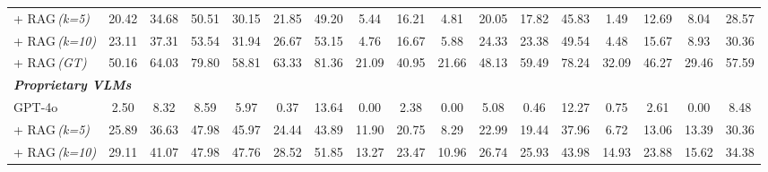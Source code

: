 \begin{table*}[t]
{\begin{tabular}{l|cc|c|c|cc|cc|cc|cc|cc|cc}
\hspace{2em}  + RAG\,\textit{(k=5)} & \colorbox{lightred!75}{20.42} & \colorbox{lightred!75}{34.68} & \colorbox{lightred!75}{50.51} & \colorbox{lightred!75}{30.15} & 21.85 & \colorbox{lightred!75}{49.20} & \colorbox{lightred!75}{5.44} & \colorbox{lightred!75}{16.21} & \colorbox{lightred!75}{4.81} & 20.05 & \colorbox{lightred!75}{17.82} & \colorbox{lightred!75}{45.83} & \colorbox{lightred!75}{1.49} & \colorbox{lightred!75}{12.69} & \colorbox{lightred!75}{8.04} & \colorbox{lightred!75}{28.57} \\

\hspace{2em}  + RAG\,\textit{(k=10)} & \colorbox{lightred!75}{23.11} & \colorbox{lightred!75}{37.31} & \colorbox{lightred!75}{53.54} & \colorbox{lightred!75}{31.94} & \colorbox{lightred!75}{26.67} & \colorbox{lightred!75}{53.15} & \colorbox{lightred!75}{4.76} & \colorbox{lightred!75}{16.67} & \colorbox{lightred!75}{5.88} & \colorbox{lightred!75}{24.33} & \colorbox{lightred!75}{23.38} & \colorbox{lightred!75}{49.54} & \colorbox{lightred!75}{4.48} & \colorbox{lightred!75}{15.67} & \colorbox{lightred!75}{8.93} & \colorbox{lightred!75}{30.36} \\

\hspace{2em}  + RAG\,\textit{(GT)} & \colorbox{lightred!75}{50.16} & \colorbox{lightred!75}{64.03} & \colorbox{lightred!75}{79.80} & \colorbox{lightred!75}{58.81} & 63.33 & \colorbox{lightred!75}{81.36} & \colorbox{lightred!75}{21.09} & \colorbox{lightred!75}{40.95} & 21.66 & \colorbox{lightred!75}{48.13} & 59.49 & 78.24 & \colorbox{lightred!75}{32.09} & \colorbox{lightred!75}{46.27} & \colorbox{lightred!75}{29.46} & \colorbox{lightred!75}{57.59} \\

\midrule
\multicolumn{17}{l}{\textit{\textbf{Proprietary VLMs}}} \\
\midrule
GPT-4o & 2.50 & 8.32 & \colorbox{lightblue!75}{8.59} & \colorbox{lightblue!75}{5.97} & 0.37 & 13.64 & \colorbox{lightblue!75}{0.00} & 2.38 & 0.00 & 5.08 & 0.46 & 12.27 & 0.75 & 2.61 & 0.00 & 8.48 \\

\hspace{2em}  + RAG\,\textit{(k=5)} & 25.89 & 36.63 & 47.98 & 45.97 & \colorbox{lightblue!75}{24.44} & 43.89 & 11.90 & 20.75 & \colorbox{lightblue!75}{8.29} & 22.99 & 19.44 & 37.96 & 6.72 & 13.06 & 13.39 & 30.36 \\

\hspace{2em}  + RAG\,\textit{(k=10)} & 29.11 & 41.07 & 47.98 & 47.76 & 28.52 & 51.85 & 13.27 & 23.47 & \colorbox{lightblue!75}{10.96} & 26.74 & \colorbox{lightblue!75}{25.93} & 43.98 & 14.93 & 23.88 & 15.62 & 34.38 \\


\end{tabular}}
\end{table*}
